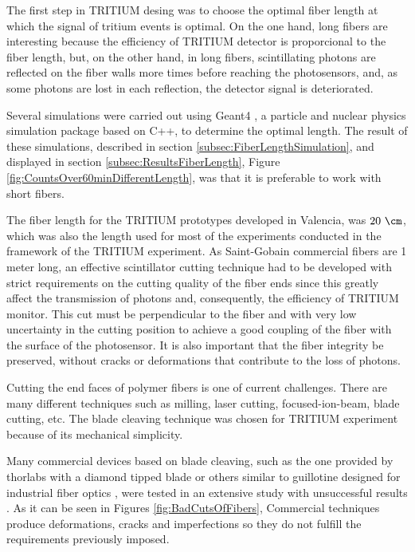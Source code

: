 The first step in TRITIUM desing was to choose the optimal fiber length at which the signal of tritium events is optimal. On the one hand, long fibers are interesting because the efficiency of TRITIUM detector is proporcional to the fiber length, but, on the other hand, in long fibers, scintillating photons are reflected on the fiber walls more times before reaching the photosensors, and, as some photons are lost in each reflection, the detector signal is deteriorated.

Several simulations were carried out using Geant4 \cite{Geant4WebPage}, a particle and nuclear physics simulation package based on C++, to determine the optimal length. The result of these simulations, described in section \ref{subsec:FiberLengthSimulation}, and displayed in section \ref{subsec:ResultsFiberLength}, Figure \ref{fig:CountsOver60minDifferentLength}, was that it is preferable to work with short fibers.

The fiber length for the TRITIUM prototypes developed in Valencia, was $20~\cm$, which was also the length used for most of the experiments conducted in the framework of the TRITIUM experiment. As Saint-Gobain commercial fibers are 1 meter long, an effective scintillator cutting technique had to be developed with strict requirements on the cutting quality of the fiber ends since this greatly affect the transmission of photons and, consequently, the efficiency of TRITIUM monitor. This cut must be perpendicular to the fiber and with very low uncertainty in the cutting position to achieve a good coupling of the fiber with the surface of the photosensor. It is also important that the fiber integrity be preserved, without cracks or deformations that contribute to the loss of photons.

Cutting the end faces of polymer fibers is one of current challenges. There are many different techniques such as milling, laser cutting, focused-ion-beam, blade cutting, etc. The blade cleaving technique was chosen for TRITIUM experiment because of its mechanical simplicity. %

Many commercial devices based on blade cleaving, such as the one provided by thorlabs with a diamond tipped blade \cite{DiamondThorlabs} or others similar to guillotine designed for industrial fiber optics \cite{GuillotineIFO}, were tested in an extensive study with unsuccessful results \cite{TFGAlberto}. As it can be seen in Figures \ref{fig:BadCutsOfFibers}, Commercial techniques produce deformations, cracks and imperfections so they do not fulfill the requirements previously imposed.

